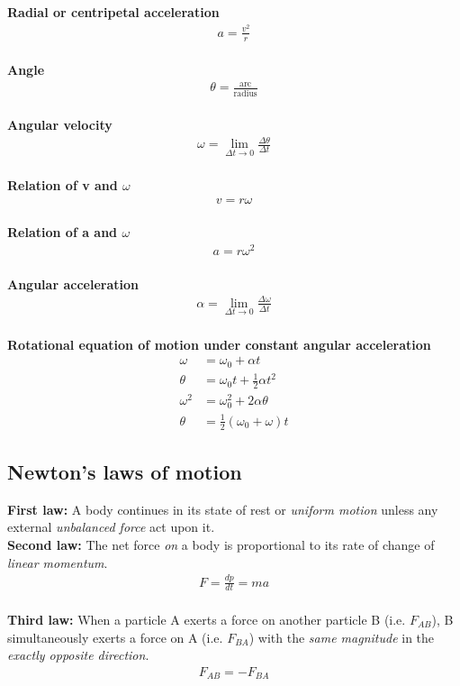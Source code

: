 \documentclass[12pt,a4paper]{article}
\begin{document}
\noindent\textbf{Radial or centripetal acceleration}
\begin{align*}
a = \frac{v^{2}}{r}
\end{align*}
\\
\textbf{Angle}
\begin{align*}
\theta = \frac{\text{arc}}{\text{radius}}
\end{align*}
\\
\textbf{Angular velocity}
\begin{align*}
\omega = \lim_{\Delta t \to 0}\frac{\Delta \theta}{\Delta t}
\end{align*}
\\
\textbf{Relation of v and $\omega$}
\begin{align}
v = r\omega
\end{align}
\\
\textbf{Relation of a and $\omega$}
\begin{align}
a = r\omega^{2}
\end{align}
\\
\textbf{Angular acceleration}
\begin{align*}
\alpha = \lim_{\Delta t \to 0}\frac{\Delta \omega}{\Delta t}
\end{align*}
\\
\textbf{Rotational equation of motion under constant angular acceleration}
\begin{align}
\omega &= \omega_{0} + \alpha t \\
\theta &= \omega_{0}t + \frac{1}{2}\alpha t^{2} \\
\omega^{2} &= \omega_{0}^{2} + 2\alpha \theta \\
\theta &= \frac{1}{2}(\omega_{0} + \omega)t
\end{align}

\subsection{Newton's laws of motion}

\noindent\textbf{First law:} A body continues in its state of rest or \emph{uniform motion} unless any external \emph{unbalanced force} act upon it.
\\
\textbf{Second law:} The net force \emph{on} a body is proportional to its rate of change of \emph{linear momentum}.
\begin{align*}
F = \frac{dp}{dt} = ma
\end{align*}
\\
\textbf{Third law:} When a particle A exerts a force on another particle B (i.e. $F_{AB}$), B simultaneously exerts a force on A (i.e. $F_{BA}$) with the \emph{same magnitude} in the \emph{exactly opposite direction}.
\begin{align*}
F_{AB} = - F_{BA}
\end{align*}
\end{document}
